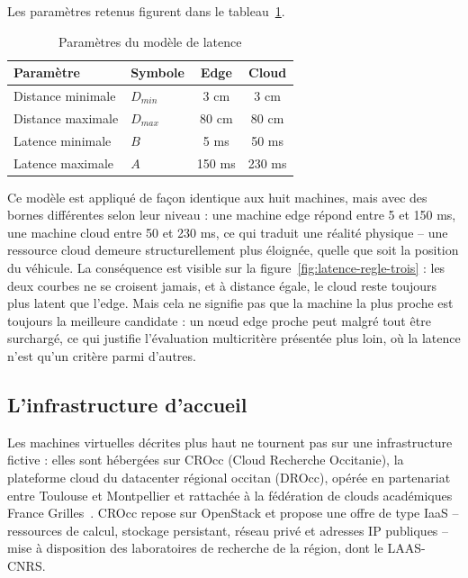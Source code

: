 Les paramètres retenus figurent dans le tableau~\ref{tab:params-latence}.

\begin{table}[H]
    \centering
    \caption{Paramètres du modèle de latence}
    \label{tab:params-latence}
    \begin{tabular}{llcc}
        \toprule
        \textbf{Paramètre} & \textbf{Symbole} & \textbf{Edge} & \textbf{Cloud} \\
        \midrule
        Distance minimale & $D_{min}$ & 3 cm & 3 cm \\
        Distance maximale & $D_{max}$ & 80 cm & 80 cm \\
        Latence minimale & $B$ & 5 ms & 50 ms \\
        Latence maximale & $A$ & 150 ms & 230 ms \\
        \bottomrule
    \end{tabular}
\end{table}

Ce modèle est appliqué de façon identique aux huit machines, mais avec des bornes différentes selon leur niveau : une machine edge répond entre 5 et 150 ms, une machine cloud entre 50 et 230 ms, ce qui traduit une réalité physique -- une ressource cloud demeure structurellement plus éloignée, quelle que soit la position du véhicule. La conséquence est visible sur la figure~\ref{fig:latence-regle-trois} : les deux courbes ne se croisent jamais, et à distance égale, le cloud reste toujours plus latent que l'edge. Mais cela ne signifie pas que la machine la plus proche est toujours la meilleure candidate : un nœud edge proche peut malgré tout être surchargé, ce qui justifie l'évaluation multicritère présentée plus loin, où la latence n'est qu'un critère parmi d'autres.
\subsection{L'infrastructure d'accueil}
\label{sec:infra-accueil}

Les machines virtuelles décrites plus haut ne tournent pas sur une infrastructure fictive : elles sont hébergées sur CROcc (Cloud Recherche Occitanie), la plateforme cloud du datacenter régional occitan (DROcc), opérée en partenariat entre Toulouse et Montpellier et rattachée à la fédération de clouds académiques France Grilles~\cite{crocc_website}. CROcc repose sur OpenStack et propose une offre de type IaaS -- ressources de calcul, stockage persistant, réseau privé et adresses IP publiques -- mise à disposition des laboratoires de recherche de la région, dont le LAAS-CNRS.

